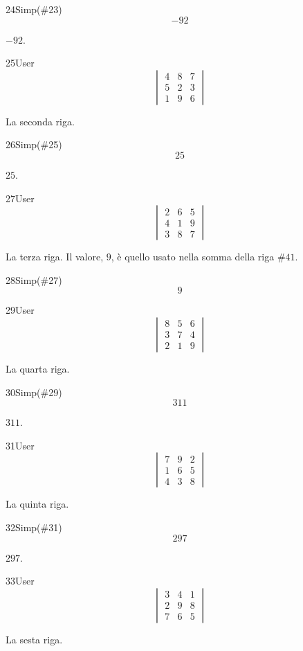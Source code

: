 \begin{espr}{24}{Simp(\#23)}{}
\[
-92
\]
\end{espr}
$-92$.

\begin{espr}{25}{User}{}
\[
\begin{vmatrix} 4 & 8 & 7 \\ 5 & 2 & 3 \\ 1 & 9 & 6 \end{vmatrix}
\]
\end{espr}
La seconda riga.

\begin{espr}{26}{Simp(\#25)}{}
\[
25
\]
\end{espr}
$25$.

\begin{espr}{27}{User}{}
\[
\begin{vmatrix} 2 & 6 & 5 \\ 4 & 1 & 9 \\ 3 & 8 & 7 \end{vmatrix}
\]
\end{espr}
La terza riga. Il valore, $9$, è quello usato nella somma della riga $\#41$.

\begin{espr}{28}{Simp(\#27)}{}
\[
9
\]
\end{espr}
\begin{espr}{29}{User}{}
\[
\begin{vmatrix} 8 & 5 & 6 \\ 3 & 7 & 4 \\ 2 & 1 & 9 \end{vmatrix}
\]
\end{espr}
La quarta riga.

\begin{espr}{30}{Simp(\#29)}{}
\[
311
\]
\end{espr}
$311$.

\begin{espr}{31}{User}{}
\[
\begin{vmatrix} 7 & 9 & 2 \\ 1 & 6 & 5 \\ 4 & 3 & 8 \end{vmatrix}
\]
\end{espr}
La quinta riga.

\begin{espr}{32}{Simp(\#31)}{}
\[
297
\]
\end{espr}
$297$.

\begin{espr}{33}{User}{}
\[
\begin{vmatrix} 3 & 4 & 1 \\ 2 & 9 & 8 \\ 7 & 6 & 5 \end{vmatrix}
\]
\end{espr}
La sesta riga.

